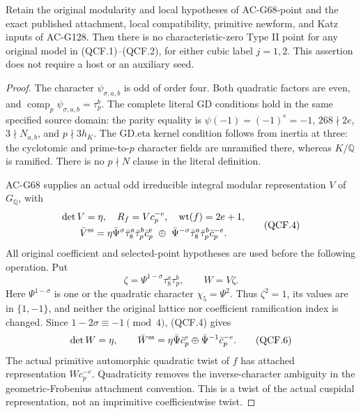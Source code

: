 \begin{lemma}
\label{AC-G139-TypeII}
Retain the original modularity and local hypotheses of AC-G68-point
and the exact published attachment, local compatibility, primitive
newform, and Katz inputs of AC-G128.  Then
there is no characteristic-zero Type II point for any original
model in (QCF.1)--(QCF.2), for either cubic label \(j=1,2\).
This assertion does not require a host or an auxiliary seed.
\end{lemma}
\begin{proof}
The character \(\psi_{\sigma,a,b}\) is odd of order four.
Both quadratic factors are even, and
\(\operatorname{comp}_p\psi_{\sigma,a,b}=\tau_p^b\).
The complete literal \(\mathrm{GD}\) conditions hold in the same
specified source domain: the parity equality is
\(\psi(-1)=(-1)^e=-1\), \(268\nmid2e\),
\(3\nmid N_{a,b}\), and \(p\nmid3h_K\).
The \(\mathrm{GD.eta}\) kernel condition follows from inertia
at three: the cyclotomic and prime-to-\(p\) character fields are
unramified there, whereas \(K/\mathbb Q\) is ramified.
There is no \(p\nmid N\) clause in the literal definition.

AC-G68 supplies an actual odd irreducible integral modular
representation \(V\) of \(G_{\mathbb Q}\), with
\[
 \begin{gathered}
 \det V=\eta,\quad R_f=Vc_p^{-e},\quad
 \operatorname{wt}(f)=2e+1,\\
 \bar V^{\rm ss}=
  \eta\bar\Psi^\sigma\bar\tau_8^a\bar\tau_p^b\bar c_p^e
   \ \oplus\ 
  \bar\Psi^{-\sigma}\bar\tau_8^a\bar\tau_p^b\bar c_p^{-e}.
 \end{gathered}
 \tag{QCF.4}
\]
All original coefficient and selected-point hypotheses are used
before the following operation.  Put
\[
 \zeta=\Psi^{1-\sigma}\tau_8^a\tau_p^b,
                      \qquad W=V\zeta.
 \tag{QCF.5}
\]
Here \(\Psi^{1-\sigma}\) is one or the quadratic character
\(\chi_5=\Psi^2\).  Thus \(\zeta^2=1\), its values are in
\(\{1,-1\}\), and neither the original lattice nor coefficient
ramification index is changed.  Since
\(1-2\sigma\equiv-1\pmod4\), (QCF.4) gives
\[
       \det W=\eta,\qquad
       \bar W^{\rm ss}=
        \eta\bar\Psi\bar c_p^e\oplus
                         \bar\Psi^{-1}\bar c_p^{-e}.
 \tag{QCF.6}
\]
The actual primitive automorphic quadratic twist of \(f\)
has attached representation \(Wc_p^{-e}\).  Quadraticity
removes the inverse-character ambiguity in the geometric-Frobenius
attachment convention.  This is a twist of the actual cuspidal
representation, not an imprimitive coefficientwise twist.


\end{proof}
